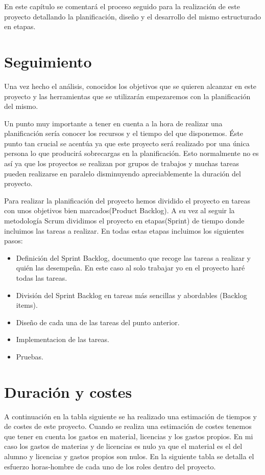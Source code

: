 

 En este capítulo se comentará el proceso seguido para la realización de este proyecto detallando la planificación, diseño y el desarrollo del mismo estructurado en etapas.
 
\section{Seguimiento}

Una vez hecho el análisis, conocidos los objetivos que se quieren alcanzar en este proyecto y las herramientas que se utilizarán  empezaremos con la planificación del mismo.

Un punto muy  importante a tener en cuenta a la hora de realizar una planificación sería conocer los recursos y el tiempo del que disponemos.
Éste punto tan crucial se acentúa ya que este proyecto será realizado por una única persona lo que producirá sobrecargas en la planificación. Esto normalmente no es así ya que los proyectos se realizan por grupos de trabajos y muchas tareas pueden realizarse en paralelo disminuyendo apreciablemente la duración del proyecto.

Para realizar la planificación del proyecto hemos dividido el proyecto en tareas con unos objetivos bien marcados(Product Backlog). A su vez al seguir la metodología Scrum dividimos el proyecto en etapas(Sprint) de tiempo donde incluimos las tareas a realizar.
 En todas estas etapas incluimos los siguientes pasos:
 
 


\begin{itemize}
\item Definición del Sprint Backlog,  documento que recoge las tareas a realizar y quién las desempeña. En este caso al solo trabajar yo en el proyecto haré todas las tareas.


\item División del Sprint Backlog en tareas más sencillas y abordables (Backlog items). 



\item Diseño de cada una de las tareas del punto anterior.
\item  Implementacion de las tareas.
\item Pruebas.
\end{itemize}



\section{Duración  y costes}
 A continuación en la tabla siguiente se ha realizado una estimación de tiempos y de costes de este proyecto.
 Cuando se realiza una estimación de costes tenemos que tener en cuenta los gastos en material, licencias y los gastos propios. En mi caso los gastos de materias y de licencias es nulo ya que el material es el del alumno y licencias y gastos propios son nulos.
 En la siguiente tabla se detalla el esfuerzo horas-hombre de cada uno de los roles dentro del proyecto. 
 
